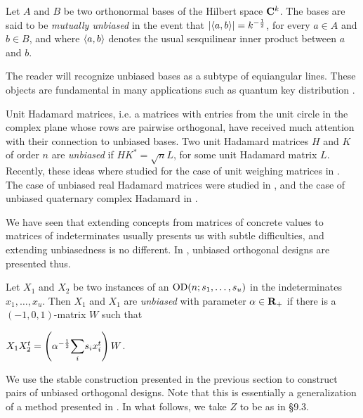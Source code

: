 \documentclass[../../../main]{subfiles}
\begin{document}
Let $A$ and $B$ be two orthonormal bases of the Hilbert space $\mathbf{C}^k$. The bases are said to be {\it mutually unbiased} in the event that $|\langle a,b\rangle|=k^{-\frac{1}{2}}$, for every $a \in A$ and $b \in B$, and where $\langle a,b\rangle$ denotes the usual sesquilinear inner product between $a$ and $b$.

The reader will recognize unbiased bases as a subtype of equiangular lines. These objects are fundamental in many applications such as quantum key distribution \cite[see][]{real-unbiased-bases}.

Unit Hadamard matrices, i.e. a matrices with entries from the unit circle in
the complex plane whose rows are pairwise orthogonal, have received much
attention with their connection to unbiased bases. Two unit Hadamard matrices
$H$ and $K$ of order $n$ are {\it unbiased} if
$HK^*=\sqrt{n}L$, for some unit Hadamard matrix $L$. Recently, these ideas
where studied for the case of unit weighing
matrices in \cite{unbiased-weighing}. The case
of unbiased real Hadamard matrices were studied in \cite{unbiased-real}, and the
case of unbiased quaternary complex Hadamard in \cite{unbiased-complex}. 

We have seen that extending concepts from matrices of concrete values to matrices of indeterminates usually presents us with subtle difficulties, and extending unbiasedness is no different. In \cite{unbiased-od}, unbiased orthogonal designs are presented thus.

\begin{defin}
 Let $X_1$ and $X_2$ be two instances of an $\text{OD}(n;s_1,\dots,s_u)$ in the indeterminates $x_1,\dots,x_u$. Then $X_1$ and $X_1$ are {\it unbiased} with parameter $\alpha \in \mathbf{R}_+$ if there is a $(-1,0,1)$-matrix $W$ such that
 \begin{defenum}
  \item $X_1X_2^t = \left(\alpha^{-\frac{1}{2}}\ssum_i s_ix_i^t\right)W$.
 \end{defenum}
\end{defin}

We use the stable construction presented in the previous section to construct pairs of unbiased orthogonal designs. Note that this is essentially a generalization of a method presented in \cite{splittable-hadamard}. In what follows, we take $Z$ to be as in \S9.3.
\end{document}
